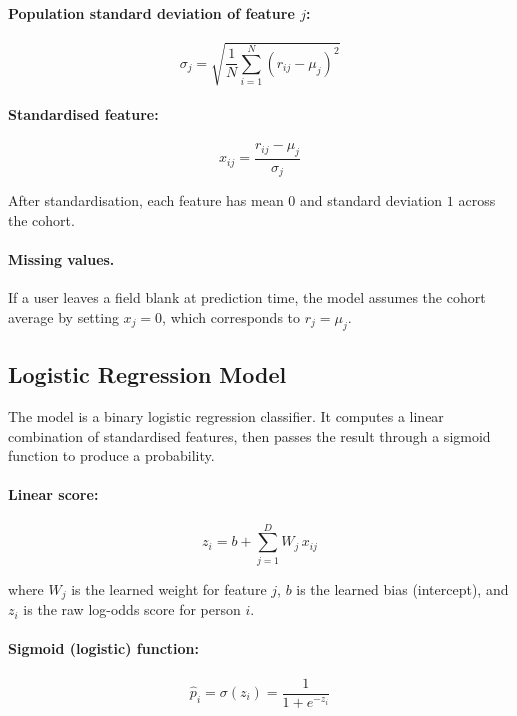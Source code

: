 \paragraph{Population standard deviation of feature $j$:}
\begin{equation}
    \sigma_j = \sqrt{\frac{1}{N}\sum_{i=1}^{N}(r_{ij} - \mu_j)^2}
\end{equation}

\paragraph{Standardised feature:}
\begin{equation}
    x_{ij} = \frac{r_{ij} - \mu_j}{\sigma_j}
\end{equation}

After standardisation, each feature has mean $0$ and standard deviation $1$ across the cohort.

\paragraph{Missing values.} If a user leaves a field blank at prediction time, the model assumes the cohort average by setting $x_j = 0$, which corresponds to $r_j = \mu_j$.

\subsection{Logistic Regression Model}

The model is a binary logistic regression classifier. It computes a linear combination of standardised features, then passes the result through a sigmoid function to produce a probability.

\paragraph{Linear score:}
\begin{equation}
    z_i = b + \sum_{j=1}^{D} W_j \, x_{ij}
    \label{eq:linear-score}
\end{equation}

where $W_j$ is the learned weight for feature $j$, $b$ is the learned bias (intercept), and $z_i$ is the raw log-odds score for person $i$.

\paragraph{Sigmoid (logistic) function:}
\begin{equation}
    \hat{p}_i = \sigma(z_i) = \frac{1}{1 + e^{-z_i}}
    \label{eq:sigmoid}
\end{equation}

